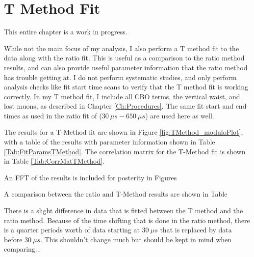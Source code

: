 \graphicspath{ {Figures/TMethod/Main/} {Figures/TMethod/ResidualsFFT/} {Figures/TMethod/Comparison/} {Figures/TMethod/RandomSeeds/} }

\chapter{T Method Fit}
\label{Ch:TMethod}

This entire chapter is a work in progress.


While not the main focus of my analysis, I also perform a T method fit to the data along with the ratio fit. This is useful as a comparison to the ratio method results, and can also provide useful parameter information that the ratio method has trouble getting at. I do not perform systematic studies, and only perform analysis checks like fit start time scans to verify that the T method fit is working correctly. In my T method fit, I include all CBO terms, the vertical waist, and lost muons, as described in Chapter \ref{Ch:Procedures}. The same fit start and end times as used in the ratio fit of ($\SI{30}{\mu s} - \SI{650}{\mu s}$) are used here as well.

The results for a T-Method fit are shown in Figure \ref{fig:TMethod_moduloPlot}, with a table of the results with parameter information shown in Table \ref{Tab:FitParamsTMethod}. The correlation matrix for the T-Method fit is shown in Table \ref{Tab:CorrMatTMethod}.

An FFT of the results is included for posterity in Figures 



A comparison between the ratio and T-Method results are shown in Table

There is a slight difference in data that is fitted between the T method and the ratio method. Because of the time shifting that is done in the ratio method, there is a quarter \gmtwo periods worth of data starting at $\SI{30}{\mu s}$ that is replaced by data before $\SI{30}{\mu s}$. This shouldn't change much but should be kept in mind when comparing...




